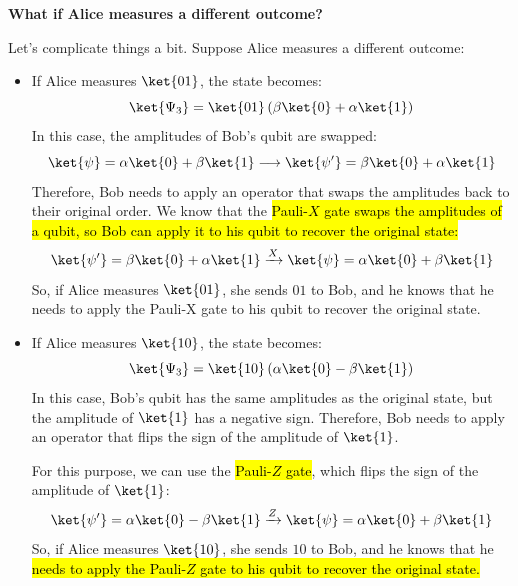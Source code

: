 \highspace
\begin{flushleft}
    \textcolor{Green3}{ \textbf{What if Alice measures a different outcome?}}
\end{flushleft}
Let's complicate things a bit. Suppose Alice measures a different outcome:
\begin{itemize}
    \item If Alice measures $\ket{01}$, the state becomes:
    \begin{equation*}
        \ket{\Psi_3} = \ket{01}\left(\beta\ket{0} + \alpha\ket{1}\right)
    \end{equation*}
    In this case, the amplitudes of Bob's qubit are swapped:
    \begin{equation*}
        \ket{\psi} = \alpha\ket{0} + \beta\ket{1} \longrightarrow \ket{\psi'} = \beta\ket{0} + \alpha\ket{1}
    \end{equation*}
    Therefore, Bob needs to apply an operator that swaps the amplitudes back to their original order. We know that the \hl{Pauli-$X$ gate swaps the amplitudes of a qubit, so Bob can apply it to his qubit to recover the original state:}
    \begin{equation*}
        \ket{\psi'} = \beta\ket{0} + \alpha\ket{1} \xrightarrow{X} \ket{\psi} = \alpha\ket{0} + \beta\ket{1}
    \end{equation*}
    So, if Alice measures $\ket{01}$, she sends $01$ to Bob, and he knows that he needs to apply the Pauli-X gate to his qubit to recover the original state.


    \item If Alice measures $\ket{10}$, the state becomes:
    \begin{equation*}
        \ket{\Psi_3} = \ket{10}\left(\alpha\ket{0} - \beta\ket{1}\right)
    \end{equation*}
    In this case, Bob's qubit has the same amplitudes as the original state, but the amplitude of $\ket{1}$ has a negative sign. Therefore, Bob needs to apply an operator that flips the sign of the amplitude of $\ket{1}$.
    
    For this purpose, we can use the \hl{Pauli-$Z$ gate}, which flips the sign of the amplitude of $\ket{1}$:
    \begin{equation*}
        \ket{\psi'} = \alpha\ket{0} - \beta\ket{1} \xrightarrow{Z} \ket{\psi} = \alpha\ket{0} + \beta\ket{1}
    \end{equation*}
    So, if Alice measures $\ket{10}$, she sends $10$ to Bob, and he knows that he \hl{needs to apply the Pauli-$Z$ gate to his qubit to recover the original state.}



\end{itemize}
